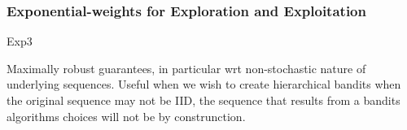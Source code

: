 




\subsubsection{Exponential-weights for Exploration and Exploitation}

Exp3

 Maximally robust guarantees, in particular wrt non-stochastic nature of underlying sequences. Useful when we wish to create hierarchical bandits when the original sequence may not be IID, the sequence that results from a bandits algorithms choices will not be by construnction.





